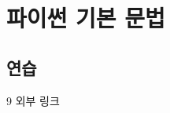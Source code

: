 \documentclass[12pt, a4paper, oneside]{book}
\let\stdsection\section
\renewcommand\section{\newpage\stdsection}
\begin{document}
	\chapter{파이썬 기본 문법}
	\noptcrule

	\newpage	
	\minitoc





	\section{ 연습}

9	외부 링크




\end{document}
